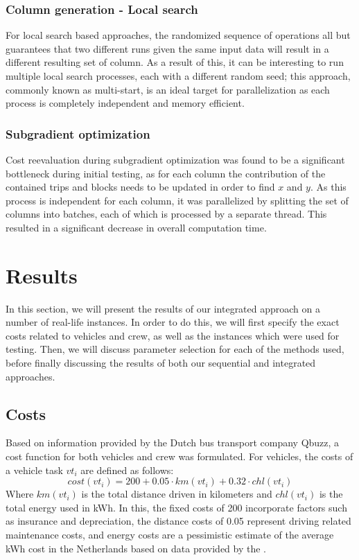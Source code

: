 \documentclass[]{article}
\begin{document}
\subsubsection{Column generation - Local search}
For local search based approaches, the randomized sequence of operations all but guarantees that two different runs given the same input data will result in a different resulting set of column. As a result of this, it can be interesting to run multiple local search processes, each with a different random seed; this approach, commonly known as multi-start, is an ideal target for parallelization as each process is completely independent and memory efficient. 

\subsubsection{Subgradient optimization}
Cost reevaluation during subgradient optimization was found to be a significant bottleneck during initial testing, as for each column the contribution of the contained trips and blocks needs to be updated in order to find $x$ and $y$. As this process is independent for each column, it was parallelized by splitting the set of columns into batches, each of which is processed by a separate thread. This resulted in a significant decrease in overall computation time.


\section{Results}
In this section, we will present the results of our integrated approach on a number of real-life instances. In order to do this, we will first specify the exact costs related to vehicles and crew, as well as the instances which were used for testing. Then, we will discuss parameter selection for each of the methods used, before finally discussing the results of both our sequential and integrated approaches.

\subsection{Costs} \label{sec:results-costs}
Based on information provided by the Dutch bus transport company Qbuzz, a cost function for both vehicles and crew was formulated. For vehicles, the costs of a vehicle task $vt_i$ are defined as follows:
\begin{equation}
cost(vt_i) = 200 + 0.05 \cdot km(vt_i) + 0.32 \cdot chl(vt_i)  \nonumber
\end{equation}
Where $km(vt_i)$ is the total distance driven in kilometers and $chl(vt_i)$ is the total energy used in kWh. In this, the fixed costs of 200 incorporate factors such as insurance and depreciation, the distance costs of 0.05 represent driving related maintenance costs, and energy costs are a pessimistic estimate of the average kWh cost in the Netherlands based on data provided by the \citet{ANWB2025}.
\end{document}
